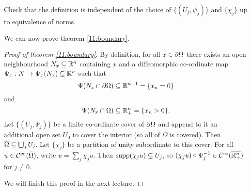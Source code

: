 \begin{exer}
  Check that the definition is independent of the choice of $\{(U_j,\psi_j)\}$ and $\{\chi_j\}$ up to equivalence of norms.
\end{exer}

We can now prove theorem \ref{11:boundary}.


\begin{proof}[Proof of theorem \ref{11:boundary}]
  By definition, for all $x\in\partial\Omega$ there exists an open neighbourhood $N_x\subseteq\mathbb{R}^n$ containing $x$ and a diffeomorphic co-ordinate map $\Psi_x: N \to \Psi_x(N_x)\subseteq\mathbb{R}^n$ such that
  \[ \Psi(N_x\cap\partial\Omega)\subseteq\mathbb{R}^{n-1}=\{x_n=0\} \]
  and 
  \[ \Psi(N_x\cap\Omega)\subseteq\mathbb{R}_+^n=\{x_n>0\}. \]
  Let $\{(U_j,\Psi_j)\}$ be a finite co-ordinate cover of $\partial\Omega$ and append to it an additional open set $U_0$ to cover the interior (so all of $\Omega$ is covered).
  Then $\overline\Omega \subseteq \bigcup_j U_j$.
  Let $\{\chi_j\}$ be a partition of unity subordinate to this cover.
  For all $u\in\mathcal{C}^\infty(\overline\Omega)$, write $u=\sum_j\chi_ju$.
  Then $\operatorname{supp}(\chi_ju)\subseteq U_j$, so $(\chi_ju)\circ\Psi_j^{-1}\in\mathcal{C}^\infty(\overline{\mathbb{R}_+^n})$ for $j\neq0$.

  We will finish this proof in the next lecture.
\end{proof}
